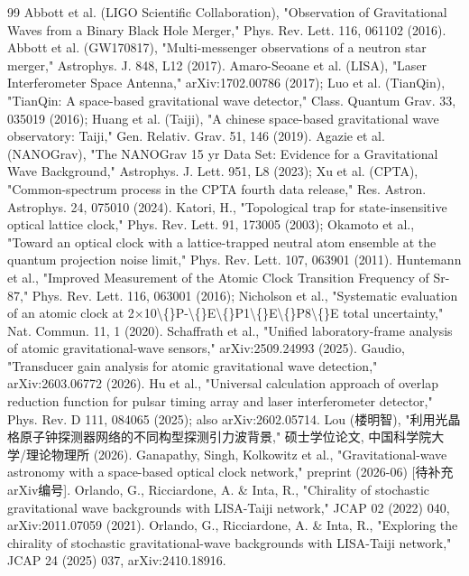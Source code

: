 \documentclass[12pt,a4paper]{article}
\begin{document}
\begin{thebibliography}{99}
 Abbott et al. (LIGO Scientific Collaboration), "Observation of Gravitational Waves from a Binary Black Hole Merger," Phys. Rev. Lett. 116, 061102 (2016).
 Abbott et al. (GW170817), "Multi-messenger observations of a neutron star merger," Astrophys. J. 848, L12 (2017).
 Amaro-Seoane et al. (LISA), "Laser Interferometer Space Antenna," arXiv:1702.00786 (2017); Luo et al. (TianQin), "TianQin: A space-based gravitational wave detector," Class. Quantum Grav. 33, 035019 (2016); Huang et al. (Taiji), "A chinese space-based gravitational wave observatory: Taiji," Gen. Relativ. Grav. 51, 146 (2019).
 Agazie et al. (NANOGrav), "The NANOGrav 15 yr Data Set: Evidence for a Gravitational Wave Background," Astrophys. J. Lett. 951, L8 (2023); Xu et al. (CPTA), "Common-spectrum process in the CPTA fourth data release," Res. Astron. Astrophys. 24, 075010 (2024).
 Katori, H., "Topological trap for state-insensitive optical lattice clock," Phys. Rev. Lett. 91, 173005 (2003); Okamoto et al., "Toward an optical clock with a lattice-trapped neutral atom ensemble at the quantum projection noise limit," Phys. Rev. Lett. 107, 063901 (2011).
 Huntemann et al., "Improved Measurement of the Atomic Clock Transition Frequency of Sr-87," Phys. Rev. Lett. 116, 063001 (2016); Nicholson et al., "Systematic evaluation of an atomic clock at 2×10\textbackslash\{\}P-\textbackslash\{\}E\textbackslash\{\}P1\textbackslash\{\}E\textbackslash\{\}P8\textbackslash\{\}E total uncertainty," Nat. Commun. 11, 1 (2020).
 Schaffrath et al., "Unified laboratory-frame analysis of atomic gravitational-wave sensors," arXiv:2509.24993 (2025).
 Gaudio, "Transducer gain analysis for atomic gravitational wave detection," arXiv:2603.06772 (2026).
 Hu et al., "Universal calculation approach of overlap reduction function for pulsar timing array and laser interferometer detector," Phys. Rev. D 111, 084065 (2025); also arXiv:2602.05714.
 Lou (楼明智), "利用光晶格原子钟探测器网络的不同构型探测引力波背景," 硕士学位论文, 中国科学院大学/理论物理所 (2026).
 Ganapathy, Singh, Kolkowitz et al., "Gravitational-wave astronomy with a space-based optical clock network," preprint (2026-06) [待补充arXiv编号].
 Orlando, G., Ricciardone, A. \& Inta, R., "Chirality of stochastic gravitational wave backgrounds with LISA-Taiji network," JCAP 02 (2022) 040, arXiv:2011.07059 (2021).
 Orlando, G., Ricciardone, A. \& Inta, R., "Exploring the chirality of stochastic gravitational-wave backgrounds with LISA-Taiji network," JCAP 24 (2025) 037, arXiv:2410.18916.

\end{thebibliography}
\end{document}
